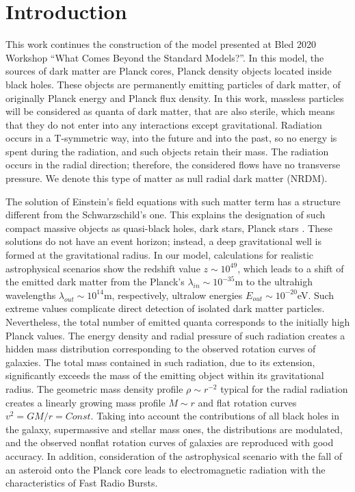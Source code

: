 \documentclass{article}
\begin{document}
\section{Introduction}
This work continues the construction of the model \cite {bled2020} presented at Bled 2020 Workshop ``What Comes Beyond the Standard Models?''. In this model, the sources of dark matter are Planck cores, Planck density objects located inside black holes. These objects are permanently emitting particles of dark matter, of originally Planck energy and Planck flux density. In this work, massless particles will be considered as quanta of dark matter, that are also sterile, which means that they do not enter into any interactions except gravitational. Radiation occurs in a T-symmetric way, into the future and into the past, so no energy is spent during the radiation, and such objects retain their mass. The radiation occurs in the radial direction; therefore, the considered flows have no transverse pressure. We denote this type of matter as null radial dark matter (NRDM).

The solution of Einstein's field equations with such matter term has a structure different from the Schwarzschild's one. This explains the designation of such compact massive objects as quasi-black holes, dark stars, Planck stars \cite {0902.0346,1612.04889,1401.6562,1409.1501}. These solutions do not have an event horizon; instead, a deep gravitational well is formed at the gravitational radius. In our model, calculations for realistic astrophysical scenarios show the redshift value $ z \sim 10 ^ {49} $, which leads to a shift of the emitted dark matter from the Planck's $ \lambda_ {in} \sim 10 ^ {- 35} $m to the ultrahigh wavelengths $ \lambda_ {out} \sim 10 ^ {14} $m, respectively, ultralow energies $ E_ {out} \sim 10 ^ {- 20} $eV. Such extreme values complicate direct detection of isolated dark matter particles. Nevertheless, the total number of emitted quanta corresponds to the initially high Planck values. The energy density and radial pressure of such radiation creates a hidden mass distribution corresponding to the observed rotation curves of galaxies. The total mass contained in such radiation, due to its extension, significantly exceeds the mass of the emitting object within its gravitational radius. The geometric mass density profile $ \rho \sim r ^ {- 2} $ typical for the radial radiation creates a linearly growing mass profile $ M \sim r $ and flat rotation curves $ v ^ 2 = GM / r = Const $. Taking into account the contributions of all black holes in the galaxy, supermassive and stellar mass ones, the distributions are modulated, and the observed nonflat rotation curves of galaxies are reproduced with good accuracy. In addition, consideration of the astrophysical scenario with the fall of an asteroid onto the Planck core leads to electromagnetic radiation with the characteristics of Fast Radio Bursts.
\end{document}
